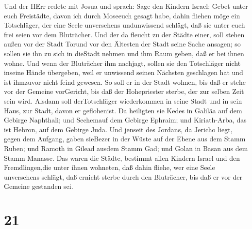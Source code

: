  Und der HErr redete mit Josua und sprach:  Sage
den Kindern Israel: Gebet unter euch Freistädte, davon ich durch
Moseeuch gesagt habe,  dahin fliehen möge ein Totschläger,
der eine Seele unversehens undunwissend schlägt, daß sie unter euch frei
seien vor dem Bluträcher.  Und der da fleucht zu der Städte
einer, soll stehen außen vor der Stadt Torund vor den Ältesten der Stadt
seine Sache ansagen; so sollen sie ihn zu sich in dieStadt nehmen und
ihm Raum geben, daß er bei ihnen wohne.  Und wenn der
Bluträcher ihm nachjagt, sollen sie den Totschläger nicht inseine Hände
übergeben, weil er unwissend seinen Nächsten geschlagen hat und ist
ihmzuvor nicht feind gewesen.  So soll er in der Stadt
wohnen, bis daß er stehe vor der Gemeine vorGericht, bis daß der
Hohepriester sterbe, der zur selben Zeit sein wird. Alsdann soll
derTotschläger wiederkommen in seine Stadt und in sein Haus, zur Stadt,
davon er geflohenist.  Da heiligten sie Kedes in Galiläa auf
dem Gebirge Naphthali; und Sechemauf dem Gebirge Ephraim; und
Kiriath-Arba, das ist Hebron, auf dem Gebirge Juda.  Und
jenseit des Jordans, da Jericho liegt, gegen dem Aufgang, gaben sieBezer
in der Wüste auf der Ebene aus dem Stamm Ruben; und Ramoth in Gilead
ausdem Stamm Gad; und Golan in Basan aus dem Stamm Manasse. 
Das waren die Städte, bestimmt allen Kindern Israel und den
Fremdlingen,die unter ihnen wohneten, daß dahin fliehe, wer eine Seele
unversehens schlägt, daß ernicht sterbe durch den Bluträcher, bis daß er
vor der Gemeine gestanden sei.

\hypertarget{section-20}{%
\section{21}\label{section-20}}

